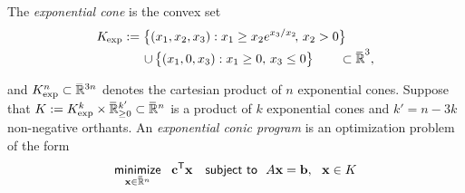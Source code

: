 \documentclass[twoside]{article}
\newcommand\discard[1]{}
\newcommand\voli[1]{{\color{olicolor}\textbf{$\boldsymbol\{$Oli: }#1 \textbf{$\boldsymbol\}$}}}
\begin{document}
The \emph{exponential cone} is the convex set
\begin{align*}
        \begin{aligned}
        K_{\mskip-1mu\exp} :=
        \big\{ (x_1, x_2, x_3) &:
                x_1 \ge x_2 e^{x_3 / x_2}\!,\, x_2 > 0 \big\}
            \\[-0.2ex]\quad \mathbin{\cup}\,
        \big\{ (x_1, 0, x_3&) : x_1 \ge 0,\, x_3 \le 0 \big\}
        \qquad \subset \mathbb {\mskip1mu\overline{\mskip-1mu\mathbb R\!}\,}^3,
    \end{aligned}
\end{align*}
\discard{\voli{It is also sometimes called the ``relative entropy'' cone, because if $\mat m, \mat p \in \Delta^{n-1} \subset \mathbb R^n$ are points on a probability simplex, then $(-\mat u, \mat m, \mat p) \in K_{\exp}^n$ if and only if $\mat u$ is an upper bound on $\mat m \log (\nicefrac{\mat m}{\mat p})$, the pointwise contribution to relative entropy at each outcome.}}
%
and
$K_{\exp}^n \subset \smash{\mskip1mu\overline{\mskip-1mu\mathbb R\!}\,}\vphantom{R}^{3n}$ denotes the cartesian product
of $n$ exponential cones. 
Suppose that $K :=  K_{\exp}^k \times \mskip1mu\overline{\mskip-1mu\mathbb R\!}\,_{\ge 0}^{k'}
\subset \mskip1mu\overline{\mskip-1mu\mathbb R\!}\,^n$ is a product of $k$ exponential cones and $k' = n - 3k$ non-negative orthants.
An \emph{exponential conic program} is an optimization problem of the form
\begin{equation}
    \mathop{\text{\sf minimize}}
        \limits_{\mathbf{x} \in \mskip1mu\overline{\mskip-1mu\mathbb R\!}\,^{n}}
        ~~ \mathbf{c}^{\sf T} \mathbf{x}
    \quad\text{\sf subject to}~~ A \mathbf{x} = \mathbf{b},~~\mathbf{x} \in 
        K
        \label{eq:exp-conic-program}
\end{equation}
\end{document}

